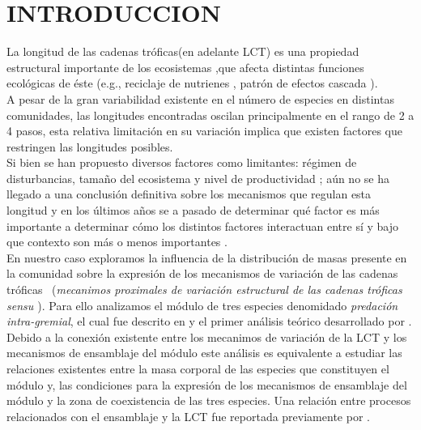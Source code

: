 \section{INTRODUCCION}

La longitud de las cadenas tr\'oficas(en adelante LCT) es una propiedad estructural importante de los ecosistemas ,que afecta distintas funciones ecol\'ogicas de \'este (e.g., reciclaje de nutrienes \citep{deangelis92}, patr\'on de efectos cascada \citep{terborgh2013trophic}).\\
A pesar de la gran variabilidad existente en el n\'umero de especies en distintas comunidades, las longitudes encontradas oscilan principalmente en el rango de 2 a 4 pasos\citep{elton1927animal,pimm1978feeding,yodzis1981structure,williams2004limits}, esta relativa limitaci\'on en su variaci\'on implica que existen factores que restringen las longitudes posibles.\\

Si bien se han propuesto diversos factores como limitantes: r\'egimen de disturbancias, tama\~no del ecosistema y nivel de productividad \citep{post2002long,takimoto2013environmental}; a\'un no se ha llegado a una conclusi\'on definitiva sobre los mecanismos que regulan esta longitud \citep{sterner1997enigma,takimoto2013environmental} y en los \'ultimos a\~nos se a pasado de determinar qu\'e factor es m\'as importante a determinar c\'omo los distintos factores interactuan entre s\'i y bajo que contexto son m\'as o menos importantes \citep{post2002long}.\\

En nuestro caso exploramos la influencia de la distribuci\'on de masas presente en la comunidad sobre la expresi\'on de los mecanismos de variaci\'on de las cadenas tr\'oficas \ (\emph{mecanimos proximales de variaci\'on estructural de las cadenas tr\'oficas sensu \cite{TP2007proximate}}). Para ello analizamos el m\'odulo de tres especies denomidado \emph{predaci\'on intra-gremial}, el cual fue descrito en \cite{polis1989ecology} y el primer an\'alisis te\'orico desarrollado por \cite{holt1997theoretical}. Debido a la conexi\'on existente entre los mecanimos de variaci\'on de la LCT y los mecanismos de ensamblaje del m\'odulo\citep{TP2007proximate} este an\'alisis es equivalente a estudiar las relaciones existentes entre la masa corporal de las especies que constituyen el m\'odulo y, las condiciones para la expresi\'on de los mecanismos de ensamblaje del m\'odulo y la zona de coexistencia de las tres especies. Una relaci\'on entre procesos relacionados con el ensamblaje y la LCT fue reportada previamente por \citet{holt2002food}.\\

